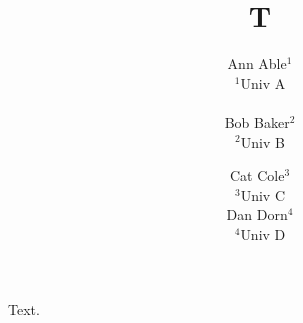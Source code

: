\documentclass{article}
\title{T}
\author{Ann Able$^1$ \\
$^1$Univ A \\
\\
Bob Baker$^2$ \\
$^2$Univ B
\and Cat Cole$^3$ \\[2pt]
$^3$Univ C \\[8pt]
Dan Dorn$^4$ \\[2pt]
$^4$Univ D}
\begin{document}
\maketitle
Text.
\end{document}
